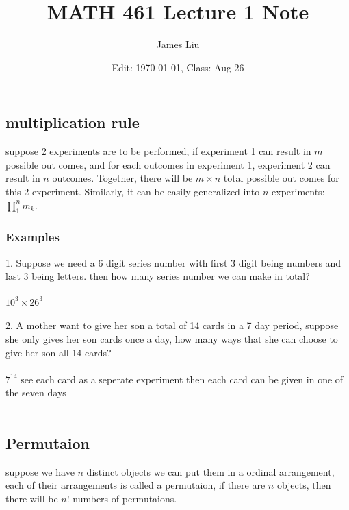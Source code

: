 \documentclass{article}
\date{Edit: \today, Class: Aug 26}
\title{MATH 461 Lecture 1 Note}
\author{James Liu}
\begin{document}
\maketitle

\subsection*{multiplication rule}
suppose 2 experiments are to be performed, if experiment 1 can result in \(m\) possible out comes,
and for each outcomes in experiment 1, experiment 2 can result in \(n\) outcomes. Together, there will be \(m\times n \) total possible
out comes for this 2 experiment. Similarly, it can be easily generalized into \(n\) experiments: \(\prod_1^n m_k \).
\subsubsection*{Examples}
1. Suppose we need a 6 digit series number with first 3 digit being numbers and last 3 being letters. then how many series number we can make in total?
\\ \\
\(10^3\times 26^3\)
\\ \\
2. A mother want to give her son a total of 14 cards in a 7 day period, suppose she only gives her son cards once a day, how many ways
that she can choose to give her son all 14 cards?
\\ \\
\(7^{14}\) see each card as a seperate experiment then each card can be given in one of the seven days
\\ \\
\newpage
\subsection*{Permutaion}
suppose we have \(n\) distinct objects we can put them in a ordinal arrangement, each of their arrangements is called a permutaion,
if there are \(n\) objects, then there will be \(n!\) numbers of permutaions.
\end{document}
